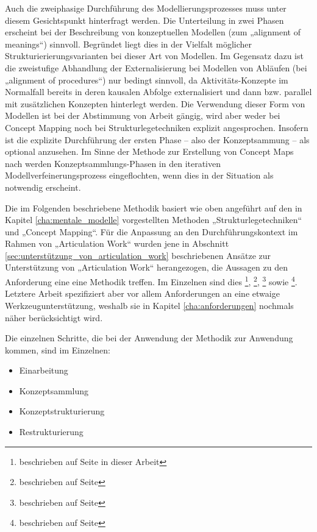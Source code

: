 Auch die zweiphasige Durchführung des Modellierungsprozesses muss unter diesem Gesichtspunkt hinterfragt werden. Die Unterteilung in zwei Phasen erscheint bei der Beschreibung von konzeptuellen Modellen (zum „alignment of meanings“) sinnvoll. Begründet liegt dies in der Vielfalt möglicher Strukturierierungsvarianten bei dieser Art von Modellen. Im Gegensatz dazu ist die zweistufige Abhandlung der Externalisierung bei Modellen von Abläufen (bei „alignment of procedures“) nur bedingt sinnvoll, da Aktivitäts-Konzepte im Normalfall bereits in deren kausalen Abfolge externalisiert und dann bzw. parallel mit zusätzlichen Konzepten hinterlegt werden. Die Verwendung dieser Form von Modellen ist bei der Abstimmung von Arbeit gängig, wird aber weder bei Concept Mapping noch bei Strukturlegetechniken explizit angesprochen. Insofern ist die explizite Durchführung der ersten Phase -- also der Konzeptsammung -- als optional anzusehen. Im Sinne der Methode zur Erstellung von Concept Maps nach \citet{Novak06} werden Konzeptsammlungs-Phasen in den iterativen Modellverfeinerungsprozess eingeflochten, wenn dies in der Situation als notwendig erscheint.

Die im Folgenden beschriebene Methodik basiert wie oben angeführt auf den in Kapitel \ref{cha:mentale_modelle} vorgestellten Methoden „Strukturlegetechniken“ und „Concept Mapping“. Für die Anpassung an den Durchführungskontext im Rahmen von „Articulation Work“ wurden jene in Abschnitt \ref{sec:unterstützung_von_articulation_work} beschriebenen Ansätze zur Unterstützung von „Articulation Work“ herangezogen, die Aussagen zu den Anforderung eine eine Methodik treffen. Im Einzelnen sind dies \citet{Corbin93}\footnote{beschrieben auf Seite \pageref{steps:corbin} in dieser Arbeit}, \citet{Jorgensen04}\footnote{beschrieben auf Seite \pageref{steps:jorgensen}}, \citet{Cabitza06}\footnote{beschrieben auf Seite \pageref{steps:cabitza}} sowie \citet{Herrmann02}\footnote{beschrieben auf Seite \pageref{steps:herrmann}}. Letztere Arbeit spezifiziert aber vor allem Anforderungen an eine etwaige Werkzeugunterstützung, weshalb sie in Kapitel \ref{cha:anforderungen} nochmals näher berücksichtigt wird.

Die einzelnen Schritte, die bei der Anwendung der Methodik zur Anwendung kommen, sind im Einzelnen:
\begin{itemize}
 \item Einarbeitung
 \item Konzeptsammlung 
 \item Konzeptstrukturierung
 \item Restrukturierung
\end{itemize}

